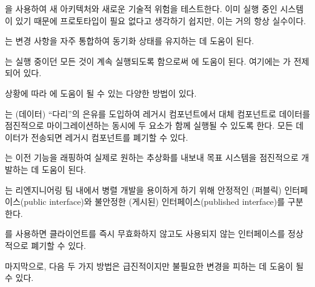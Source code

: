 \documentclass[a4paper,10pt,twoside]{book}
\begin{document}
\begin{bulletlist}
\item {}을 사용하여 새 아키텍처와 새로운 기술적 위험을 테스트한다. 이미 실행 중인 시스템이 있기 때문에 프로토타입이 필요 없다고 생각하기 쉽지만, 이는 거의 항상 실수이다.

\item {}는 변경 사항을 자주 통합하여 동기화 상태를 유지하는 데 도움이 된다.

\item {}는 실행 중이던 모든 것이 계속 실행되도록 함으로써 에 도움이 된다. 여기에는 가 전제되어 있다.
\end{bulletlist}

상황에 따라 에 도움이 될 수 있는 다양한 방법이 있다.

\begin{bulletlist}
\item {}는 (데이터) ``다리''의 은유를 도입하여 레거시 컴포넌트에서 대체 컴포넌트로 데이터를 점진적으로 마이그레이션하는 동시에 두 요소가 함께 실행될 수 있도록 한다. 모든 데이터가 전송되면 레거시 컴포넌트를 폐기할 수 있다.

\item {}는 이전 기능을 래핑하여 실제로 원하는 추상화를 내보내 목표 시스템을 점진적으로 개발하는 데 도움이 된다.

\item {}는 리엔지니어링 팀 내에서 병렬 개발을 용이하게 하기 위해 안정적인 (퍼블릭) 인터페이스(public interface)와 불안정한 (게시된) 인터페이스(published interface)를 구분한다.

\item {}를 사용하면 클라이언트를 즉시 무효화하지 않고도 사용되지 않는 인터페이스를 정상적으로 폐기할 수 있다.
\end{bulletlist}

마지막으로, 다음 두 가지 방법은 급진적이지만 불필요한 변경을 피하는 데 도움이 될 수 있다.
\end{document}
